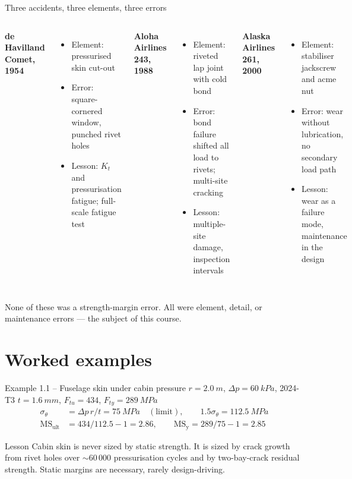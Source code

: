 \documentclass[aspectratio=169,10pt]{beamer}
\begin{document}
\begin{frame}{Three accidents, three elements, three errors}
\begin{columns}[T]
\textbf{de Havilland Comet, 1954}
\begin{itemize}
  \item Element: pressurised skin cut-out
  \item Error: square-cornered window, punched rivet holes
  \item Lesson: $K_t$ and pressurisation fatigue; full-scale fatigue test
\end{itemize}
\textbf{Aloha Airlines 243, 1988}
\begin{itemize}
  \item Element: riveted lap joint with cold bond
  \item Error: bond failure shifted all load to rivets; multi-site cracking
  \item Lesson: multiple-site damage, inspection intervals
\end{itemize}
\textbf{Alaska Airlines 261, 2000}
\begin{itemize}
  \item Element: stabiliser jackscrew and acme nut
  \item Error: wear without lubrication, no secondary load path
  \item Lesson: wear as a failure mode, maintenance in the design
\end{itemize}
\end{columns}
\vspace{6pt}
\begin{block}{}
None of these was a strength-margin error. All were element, detail, or maintenance errors --- the subject of this course.
\end{block}
\end{frame}

\section{Worked examples}

\begin{frame}{Example 1.1 -- Fuselage skin under cabin pressure}
$r=\SI{2.0}{m}$, $\Delta p=\SI{60}{kPa}$, 2024-T3 $t=\SI{1.6}{mm}$, $F_{tu}=434$, $F_{ty}=\SI{289}{MPa}$
\begin{align*}
\sigma_\theta &= \Delta p\,r/t = \SI{75}{MPa}\quad(\text{limit}), \qquad 1.5\sigma_\theta=\SI{112.5}{MPa}\\
\mathrm{MS}_{\text{ult}} &= 434/112.5-1 = 2.86, \qquad \mathrm{MS}_{\text{y}}=289/75-1=2.85
\end{align*}
\begin{alertblock}{Lesson}
Cabin skin is never sized by static strength. It is sized by crack growth from rivet holes over $\sim$60\,000 pressurisation cycles and by two-bay-crack residual strength. Static margins are necessary, rarely design-driving.
\end{alertblock}
\end{frame}
\end{document}
